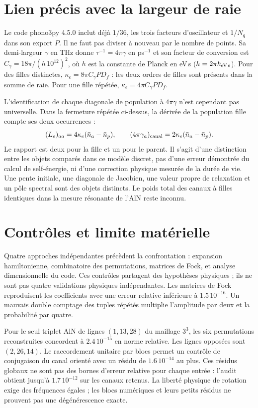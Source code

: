 \documentclass[11pt,a4paper]{article}
\begin{document}
\section{Lien précis avec la largeur de raie}
Le code phono3py 4.5.0 inclut déjà $1/36$, les trois facteurs
d'oscillateur et $1/N_q$ dans son export $P$. Il ne faut pas diviser
à nouveau par le nombre de points.
Sa demi-largeur $\gamma$ en THz donne $\tau^{-1}=4\pi\gamma$ en
ps$^{-1}$ et son facteur de conversion est
$C_\gamma=18\pi/(h\,10^{12})^2$, où $h$ est la constante de
Planck en eV\,s ($h=2\pi\hbar_{\rm eV\,s}$).
Pour des filles distinctes, $\kappa_e=8\pi C_\gamma P D_f$ :
les deux ordres de filles sont présents dans la somme de raie.
Pour une fille répétée, $\kappa_e=4\pi C_\gamma P D_f$.

L'identification de chaque diagonale de population à $4\pi\gamma$
n'est cependant pas universelle. Dans la fermeture répétée ci-dessus,
la dérivée de la population fille compte ses deux occurrences :
\[
 (L_e)_{aa}=4\kappa_e(\bar n_a-\bar n_p),\qquad
 (4\pi\gamma_a)_{\rm canal}=2\kappa_e(\bar n_a-\bar n_p).
\]
Le rapport est deux pour la fille et un pour le parent. Il s'agit
d'une distinction entre les objets comparés dans ce modèle discret,
pas d'une erreur démontrée du calcul de self-énergie, ni d'une
correction physique mesurée de la durée de vie. Une pente initiale,
une diagonale de Jacobien, une valeur propre de relaxation et un pôle
spectral sont des objets distincts. Le poids total des canaux à filles
identiques dans la mesure résonante de l'AlN reste inconnu.

\section{Contrôles et limite matérielle}
Quatre approches indépendantes précèdent la confrontation : expansion
hamiltonienne, combinatoire des permutations, matrices de Fock, et
analyse dimensionnelle du code. Ces contrôles partagent des hypothèses
physiques ; ils ne sont pas quatre validations physiques indépendantes.
Les matrices de Fock reproduisent les
coefficients avec une erreur relative inférieure à $1.5\,10^{-16}$.
Un mauvais double comptage des tuples répétés multiplie l'amplitude
par deux et la probabilité par quatre.

Pour le seul triplet AlN de lignes $(1,13,28)$ du maillage $3^3$,
les six permutations reconstruites concordent à $2.4\,10^{-15}$
en norme relative. Les lignes opposées sont $(2,26,14)$.
Le raccordement unitaire par blocs permet un contrôle de conjugaison
du canal orienté avec un résidu de $1.6\,10^{-14}$ au plus.
Ces résidus globaux ne sont pas des bornes d'erreur relative pour
chaque entrée : l'audit obtient jusqu'à $1.7\,10^{-12}$ sur les canaux
retenus. La liberté physique de rotation exige des fréquences égales ; les blocs
numériques et leurs petits résidus ne prouvent pas une dégénérescence exacte.
\end{document}

